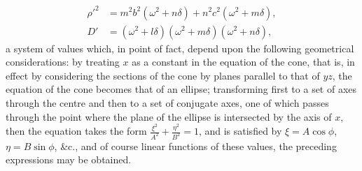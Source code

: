 \documentclass[11pt,a4paper]{book}
\begin{document}
\begin{align*}
\rho'^{2} &= m^{2}b^{2}(\omega^{2} + n\delta) + n^{2}c^{2}(\omega^{2} + m\delta), \\
D' &= (\omega^{2} + l\delta)(\omega^{2} + m\delta)(\omega^{2} + n\delta),
\end{align*}
a system of values which, in point of fact, depend upon the following geometrical considerations: by treating $x$ as a constant in the equation of the cone, that is, in effect by considering the sections of the cone by planes parallel to that of $yz$, the equation of the cone becomes that of an ellipse; transforming first to a set of axes through the centre and then to a set of conjugate axes, one of which passes through the point where the plane of the ellipse is intersected by the axis of $x$, then the equation takes the form $\frac{\xi^{2}}{A^{2}} + \frac{\eta^{2}}{B^{2}} = 1$, and is satisfied by $\xi = A\cos\phi$, $\eta = B\sin\phi$, \&c., and of course linear functions of these values, the preceding expressions may be obtained.

\newpage

\setcounter{page}{436}
\end{document}
